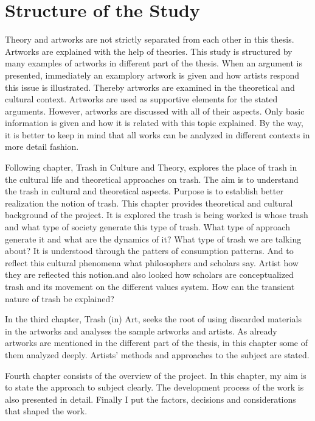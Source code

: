 \section{Structure of the Study}
Theory and artworks are not strictly separated from each other in this thesis. Artworks are explained with the help of theories. This study is structured by many examples of artworks in different part of the thesis. When an argument is presented, immediately an examplory artwork is given and how artists respond this issue is illustrated. Thereby artworks are examined in the theoretical and cultural context. Artworks are used as supportive elements for the stated arguments. However, artworks are discussed with all of their aspects. Only basic information is given and how it is related with this topic explained. By the way, it is better to keep in mind that all works can be analyzed in different contexts in more detail fashion.

Following chapter, Trash in Culture and Theory, explores the place of trash in the cultural life and theoretical approaches on trash. The aim is to understand the trash in cultural and theoretical aspects. Purpose is to establish better realization the notion of trash. This chapter provides theoretical and cultural background of the project. It is explored the trash is being worked is whose trash and what type of society generate this type of trash. What type of approach generate it and what are the dynamics of it? What type of trash we are talking about? It is understood through the patters of consumption patterns. And to reflect this cultural phenomena what philosophers and scholars say. Artist how they are reflected this notion.and also looked how scholars are conceptualized trash and its movement on the different values system. How can the transient nature of trash be explained?

In the third chapter, Trash (in) Art, seeks the root of using discarded materials in the artworks and analyses the sample artworks and artists. As already artworks are mentioned in the different part of the thesis, in this chapter some of them analyzed deeply. Artists’ methods and approaches to the subject are stated.

Fourth chapter consists of the overview of the project. In this chapter, my aim is to state the approach to subject clearly. The development process of the work is also presented in detail. Finally I put the factors, decisions and considerations that shaped the work.

